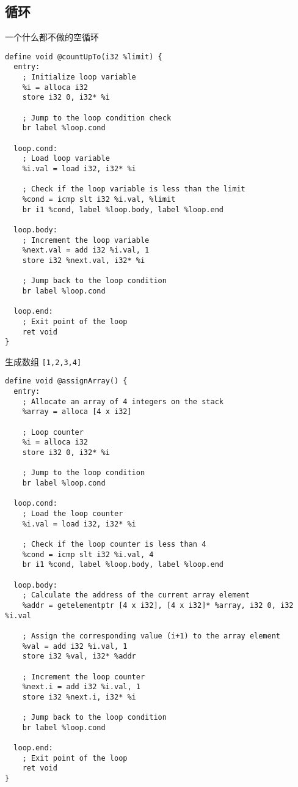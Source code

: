 \subsection{循环}
一个什么都不做的空循环
\begin{lstlisting}[language=none]
define void @countUpTo(i32 %limit) {
  entry:
    ; Initialize loop variable
    %i = alloca i32
    store i32 0, i32* %i

    ; Jump to the loop condition check
    br label %loop.cond

  loop.cond:
    ; Load loop variable
    %i.val = load i32, i32* %i

    ; Check if the loop variable is less than the limit
    %cond = icmp slt i32 %i.val, %limit
    br i1 %cond, label %loop.body, label %loop.end

  loop.body:
    ; Increment the loop variable
    %next.val = add i32 %i.val, 1
    store i32 %next.val, i32* %i

    ; Jump back to the loop condition
    br label %loop.cond

  loop.end:
    ; Exit point of the loop
    ret void
}
\end{lstlisting}

生成数组 \verb`[1,2,3,4]`
\begin{lstlisting}[language=none]
define void @assignArray() {
  entry:
    ; Allocate an array of 4 integers on the stack
    %array = alloca [4 x i32]

    ; Loop counter
    %i = alloca i32
    store i32 0, i32* %i

    ; Jump to the loop condition
    br label %loop.cond

  loop.cond:
    ; Load the loop counter
    %i.val = load i32, i32* %i

    ; Check if the loop counter is less than 4
    %cond = icmp slt i32 %i.val, 4
    br i1 %cond, label %loop.body, label %loop.end

  loop.body:
    ; Calculate the address of the current array element
    %addr = getelementptr [4 x i32], [4 x i32]* %array, i32 0, i32 %i.val

    ; Assign the corresponding value (i+1) to the array element
    %val = add i32 %i.val, 1
    store i32 %val, i32* %addr

    ; Increment the loop counter
    %next.i = add i32 %i.val, 1
    store i32 %next.i, i32* %i

    ; Jump back to the loop condition
    br label %loop.cond

  loop.end:
    ; Exit point of the loop
    ret void
}
\end{lstlisting}

